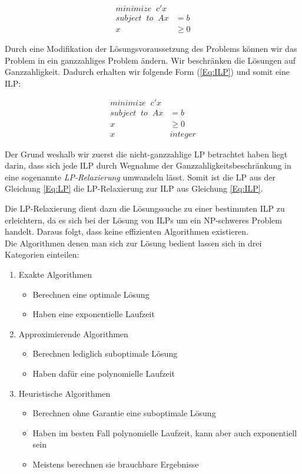 \documentclass[tog]{acmsiggraph}
\begin{document}
\large
\begin{align}
\label{Eq:LP}
minimize \;\; c'x & \nonumber \\
subject \;\; to \;\; Ax &= b \nonumber \\
x &\geq 0
\end{align}
\normalsize

Durch eine Modifikation der Lösungsvoraussetzung des Problems können wir das Problem in ein ganzzahliges Problem ändern. Wir beschränken die Lösungen auf Ganzzahligkeit. Dadurch erhalten wir folgende Form (\ref{Eq:ILP}) und somit eine ILP:

\large
\begin{align}
\label{Eq:ILP}
minimize \;\; c'x & \nonumber \\
subject \;\; to \;\; Ax &= b \nonumber \\
x &\geq 0 \nonumber \\
x \;\; &integer
\end{align}
\normalsize

Der Grund weshalb wir zuerst die nicht-ganzzahlige LP betrachtet haben liegt darin, dass sich jede ILP durch Wegnahme der Ganzzahligkeitsbeschränkung in eine sogenannte \textit{LP-Relaxierung} umwandeln lässt. Somit ist die LP aus der Gleichung \ref{Eq:LP} die LP-Relaxierung zur ILP aus Gleichung \ref{Eq:ILP}.

Die LP-Relaxierung dient dazu die Lösungssuche zu einer bestimmten ILP zu erleichtern, da es sich bei der Lösung von ILPs um ein NP-schweres Problem handelt. Daraus folgt, dass keine effizienten Algorithmen existieren.\\
Die Algorithmen denen man sich zur Lösung bedient lassen sich in drei Kategorien einteilen:

\begin{enumerate}
\item Exakte Algorithmen
\begin{itemize}
\item Berechnen eine optimale Lösung
\item Haben eine exponentielle Laufzeit
\end{itemize}
\item Approximierende Algorithmen
\begin{itemize}
\item Berechnen lediglich suboptimale Lösung
\item Haben dafür eine polynomielle Laufzeit
\end{itemize}
\item Heuristische Algorithmen
\begin{itemize}
\item Berechnen ohne Garantie eine suboptimale Lösung
\item Haben im besten Fall polynomielle Laufzeit, kann aber auch exponentiell sein
\item Meistens berechnen sie brauchbare Ergebnisse
\end{itemize}
\end{enumerate}
\end{document}
